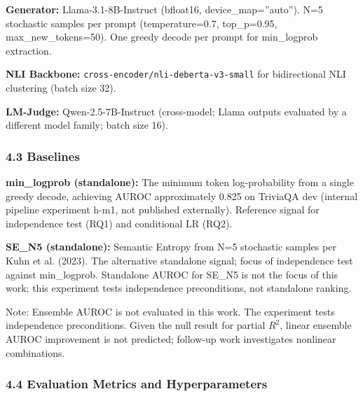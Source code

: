 \textbf{Generator:} Llama-3.1-8B-Instruct (bfloat16, device\_map=''auto''). N=5 stochastic samples per prompt (temperature=0.7, top\_p=0.95, max\_new\_tokens=50). One greedy decode per prompt for min\_logprob extraction.

\textbf{NLI Backbone:} \texttt{cross-encoder/nli-deberta-v3-small} for bidirectional NLI clustering (batch size 32).

\textbf{LM-Judge:} Qwen-2.5-7B-Instruct (cross-model; Llama outputs evaluated by a different model family; batch size 16).

\subsubsection{4.3 Baselines}

\textbf{min\_logprob (standalone):} The minimum token log-probability from a single greedy decode, achieving AUROC approximately 0.825 on TriviaQA dev (internal pipeline experiment h-m1, not published externally). Reference signal for independence test (RQ1) and conditional LR (RQ2).

\textbf{SE\_N5 (standalone):} Semantic Entropy from N=5 stochastic samples per Kuhn et al. (2023). The alternative standalone signal; focus of independence test against min\_logprob. Standalone AUROC for SE\_N5 is not the focus of this work; this experiment tests independence preconditions, not standalone ranking.

Note: Ensemble AUROC is not evaluated in this work. The experiment tests independence preconditions. Given the null result for partial $R^2$, linear ensemble AUROC improvement is not predicted; follow-up work investigates nonlinear combinations.

\subsubsection{4.4 Evaluation Metrics and Hyperparameters}

\begin{table}[htbp]
\centering
{}
\end{table}

